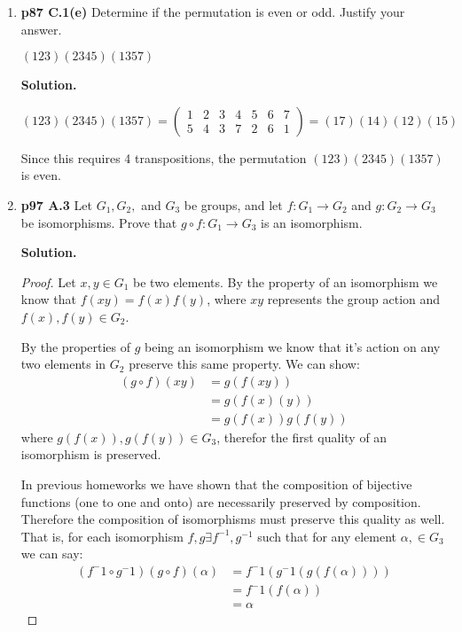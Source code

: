 \documentclass[11pt]{article}
\begin{document}
\begin{enumerate}
	{\bfseries Solution.}
	
	$\pi = \begin{pmatrix}
		1 & 2 & 3 & 4 & 5 & 6 & 7 & 8 \\
		7 & 4 & 1 & 5 & 6 & 2 & 3 & 8
	\end{pmatrix}
	= (173)(2456) = (17)(37)(24)(45)(56)$
	
	Since this requires 5 transpositions, the permutation $\pi$ is odd.

\item {\bfseries p87 C.1(e)} Determine if the permutation is even or odd. Justify your answer.

	$(123)(2345)(1357)$
  
	{\bfseries Solution.}
	
	$(123)(2345)(1357) = \begin{pmatrix}
		1 & 2 & 3 & 4 & 5 & 6 & 7 \\
		5 & 4 & 3 & 7 & 2 & 6 & 1
	\end{pmatrix} = (17)(14)(12)(15)$
	
	Since this requires 4 transpositions, the permutation $(123)(2345)(1357)$ is even.
  
\newpage

\item {\bfseries p97 A.3} Let $G_1, G_2,$ and $G_3$ be groups, and let $f : G_1 \rightarrow G_2$ and $g : G_2 \rightarrow G_3$ be isomorphisms. Prove that $g \circ f : G_1 \rightarrow G_3$ is an isomorphism.
  
	{\bfseries Solution.}
	\begin{proof}
          Let $x,y \in G_1$ be two elements.
          By the property of an isomorphism we know that $f(xy) = f(x)f(y)$, where $xy$ represents the group action and $f(x), f(y) \in G_2$.
          
          By the properties of $g$ being an isomorphism we know that it's action on any two elements in $G_2$ preserve this same property. We can show:
          \begin{align*}
            (g \circ f)(xy) &= g(f(xy)) \\
            &= g(f(x)(y)) \\
            &= g(f(x))g(f(y))
          \end{align*}
          where $g(f(x)), g(f(y)) \in G_3$, therefor the first quality of an isomorphism is preserved.
          
          In previous homeworks we have shown that the composition of bijective functions (one to one and onto) are necessarily preserved by composition.
          Therefore the composition of isomorphisms must preserve this quality as well.
          That is, for each isomorphism $f,g \exists f^{-1}, g^{-1}$ 
          such that for any element $\alpha, \in G_3$ we can say: 
          \begin{align*}
            (f^-1 \circ g^-1)(g \circ f)(\alpha) &= f^-1(g^-1(g(f(\alpha)))) \\
            &= f^-1(f(\alpha)) \\
            &= \alpha 
          \end{align*}
          

\end{proof}
\end{enumerate}
\end{document}
